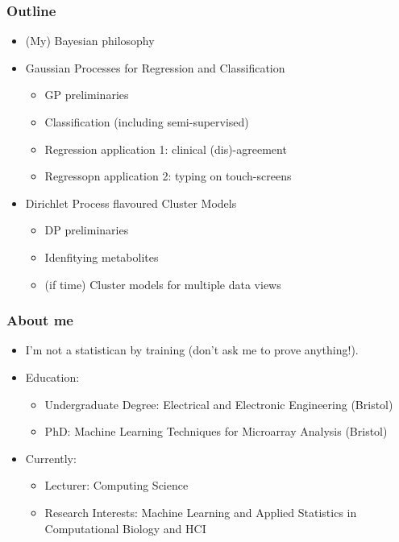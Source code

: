 \begin{frame}
	\frametitle{Outline}
	\begin{itemize}
		\item (My) Bayesian philosophy
		\item Gaussian Processes for Regression and Classification
		\begin{itemize}
			\item GP preliminaries
			\item Classification (including semi-supervised)
			\item Regression application 1: clinical (dis)-agreement
			\item Regressopn application 2: typing on touch-screens
		\end{itemize}
		\item Dirichlet Process flavoured Cluster Models
		\begin{itemize}
			\item DP preliminaries
			\item Idenfitying metabolites
			\item (if time) Cluster models for multiple data views
		\end{itemize}
	\end{itemize}
\end{frame}

\begin{frame}
	\frametitle{About me}
	\begin{itemize}
		\item I'm not a statistican by training (don't ask me to prove anything!).
		\item Education:
		\begin{itemize}
			\item Undergraduate Degree: Electrical and Electronic Engineering (Bristol)
			\item PhD: Machine Learning Techniques for Microarray Analysis (Bristol)
		\end{itemize}
		\item Currently:
		\begin{itemize}
			\item Lecturer: Computing Science
			\item Research Interests: Machine Learning and Applied Statistics in Computational Biology and \ac{HCI}
		\end{itemize}
	\end{itemize}
	
\end{frame}